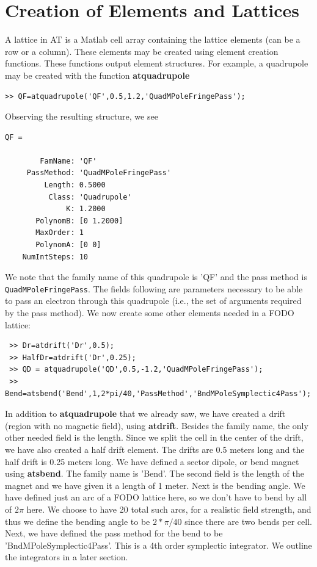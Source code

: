 \documentclass[acus]{article}
\newcommand{\mfun}[1]{{\bf{#1}}}
\newcommand{\passmethod}[1]{{\texttt{#1}}}
\begin{document}
\section{Creation of Elements and Lattices}
A lattice in AT is a Matlab cell array containing the lattice elements (can be a row or a column).
These elements may be created using element creation functions.  These functions output element structures.  For example, a quadrupole may be created with the function \mfun{atquadrupole}
\begin{verbatim}
>> QF=atquadrupole('QF',0.5,1.2,'QuadMPoleFringePass');
\end{verbatim}
Observing the resulting structure, we see
\begin{verbatim}
QF = 

        FamName: 'QF'
     PassMethod: 'QuadMPoleFringePass'
         Length: 0.5000
          Class: 'Quadrupole'
              K: 1.2000
       PolynomB: [0 1.2000]
       MaxOrder: 1
       PolynomA: [0 0]
    NumIntSteps: 10
\end{verbatim}
We note that the family name of this quadrupole is 'QF' and the pass method is \passmethod{QuadMPoleFringePass}.  The fields following are 
parameters necessary to be able to pass an electron through this quadrupole (i.e., the set of arguments required by the pass
 method).  We now create some other elements needed in a FODO lattice:
 \begin{verbatim}
 >> Dr=atdrift('Dr',0.5);
 >> HalfDr=atdrift('Dr',0.25);
 >> QD = atquadrupole('QD',0.5,-1.2,'QuadMPoleFringePass');
 >> Bend=atsbend('Bend',1,2*pi/40,'PassMethod','BndMPoleSymplectic4Pass');
 \end{verbatim}
In addition to \mfun{atquadrupole} that we already saw, we have created a drift (region with no 
magnetic field), using \mfun{atdrift}.  Besides the family name, the only other needed field is the
length.  Since we split the cell in the center of the drift, we have also created a half drift
element.  The drifts are 0.5 meters long and the half drift is 0.25 meters long.
We have defined a sector dipole, or bend magnet using \mfun{atsbend}.  The family name is 'Bend'.  The
second field is the length of the magnet and we have given it a length of 1 meter.  Next is the bending
angle.  We have defined just an arc of a FODO lattice here, so we don't have to bend by all of $2\pi$
here.  We choose to have 20 total such arcs, for a realistic field strength, and thus we define the
bending angle to be $2*\pi/40$ since there are two bends per cell.  Next, we have defined the pass
method for the bend to be 'BndMPoleSymplectic4Pass'.  This is a 4th order symplectic integrator. 
We outline the integrators in a later section.  
\end{document}
